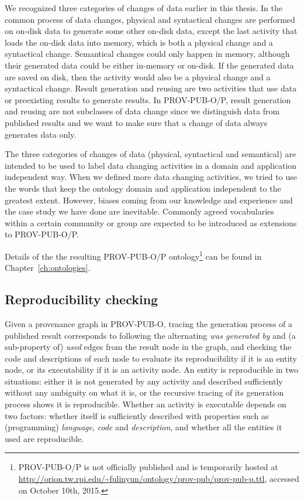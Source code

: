 We recognized three categories of changes of data earlier in this thesis. In the common process of data changes, physical and syntactical changes are performed on on-disk data to generate some other on-disk data, except the last activity that loads the on-disk data into memory, which is both a physical change and a syntactical change. Semantical changes could only happen in memory, although their generated data could be either in-memory or on-disk. If the generated data are saved on disk, then the activity would also be a physical change and a syntactical change. Result generation and reusing are two activities that use data or preexisting results to generate results. In PROV-PUB-O/P, result generation and reusing are not subclasses of data change since we distinguish data from published results and we want to make sure that a change of data always generates data only. 

The three categories of changes of data (physical, syntactical and semantical) are intended to be used to label data changing activities in a domain and application independent way. When we defined more data changing activities, we tried to use the words that keep the ontology domain and application independent to the greatest extent. However, biases coming from our knowledge and experience and the case study we have done are inevitable. Commonly agreed vocabularies within a certain community or group are expected to be introduced as extensions to PROV-PUB-O/P.

Details of the the resulting PROV-PUB-O/P ontology\footnote{PROV-PUB-O/P is not officially published and is temporarily hosted at \url{http://orion.tw.rpi.edu/~fulinyun/ontology/prov-pub/prov-pub-p.ttl}, accessed on October 10th, 2015.} can be found in Chapter~\ref{ch:ontologies}.

\subsection{Reproducibility checking}
Given a provenance graph in PROV-PUB-O, tracing the generation process of a published result corresponds to following the alternating \emph{was generated by} and (a sub-property of) \emph{used} edges from the result node in the graph, and checking the code and descriptions of each node to evaluate its reproducibility if it is an entity node, or its executability if it is an activity node. An entity is reproducible in two situations: either it is not generated by any activity and described sufficiently without any ambiguity on what it is, or the recursive tracing of its generation process shows it is reproducible. Whether an activity is executable depends on two factors: whether itself is sufficiently described with properties such as (programming) \emph{language}, \emph{code} and \emph{description}, and whether all the entities it used are reproducible. 

